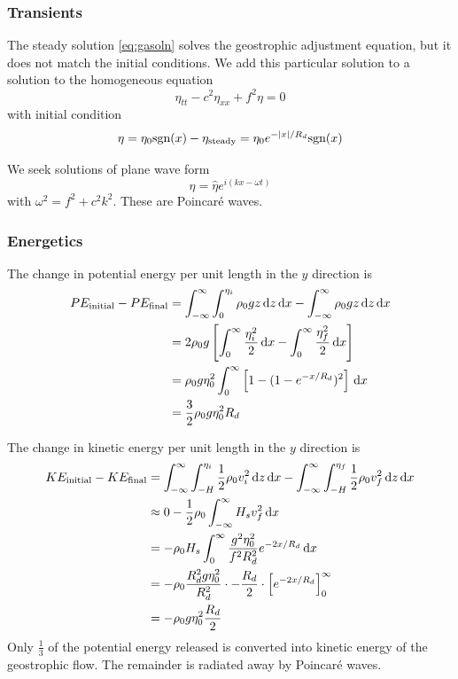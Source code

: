 \documentclass{jknotes}
\begin{document}
\subsubsection{Transients}

The steady solution \eqref{eq:gasoln} solves the geostrophic adjustment
equation, but it does not match the initial conditions. We add this particular
solution to a solution to the homogeneous equation
\begin{equation}
	\eta_{tt} - c^2 \eta_{xx} + f^2 \eta = 0
\end{equation}
with initial condition
\begin{equation}
	\eta = \eta_0 \text{sgn}(x) - \eta_{\text{steady}} = \eta_0
	e^{-\abs{x}/R_d}\text{sgn}(x)
\end{equation}

We seek solutions of plane wave form
\begin{equation}
	\eta = \hat{\eta} e^{i(kx-\omega t)}
\end{equation}
with $\omega^2 = f^2 + c^2 k^2$. These are Poincar\'{e} waves.

\subsubsection{Energetics}
The change in potential energy per unit length in the $y$ direction is
\begin{align}
	PE_{\text{initial}} - PE_{\text{final}} &= \int_{-\infty}^\infty
	\int_0^{\eta_i} \rho_0 g z \, \diffd z \, \diffd x - \int_{-\infty}^\infty
	\rho_0 g z \, \diffd z\,\diffd x \\
	&= 2\rho_0 g \left[ \int_0^\infty \frac{\eta_i^2}{2}\,\diffd x -
\int_0^\infty \frac{\eta_f^2}{2}\,\diffd x \right] \\
&= \rho_0 g \eta_0^2 \int_0^\infty \left[ 1- (1-e^{-x/R_d})^2\right] \, \diffd
x\\
&= \frac{3}{2}\rho_0 g \eta_0^2 R_d
\end{align}

The change in kinetic energy per unit length in the $y$ direction is
\begin{align}
	KE_{\text{initial}} - KE_{\text{final}} &= \int_{-\infty}^\infty
	\int_{-H}^{\eta_i} \frac{1}{2} \rho_0 v_i^2 \,\diffd z\, \diffd x -
	\int_{-\infty}^\infty \int_{-H}^{\eta_f} \frac{1}{2} \rho_0 v_f^2 \,\diffd
	z\, \diffd x \\
	&\approx 0 - \frac{1}{2}\rho_0 \int_{-\infty}^\infty H_s v^2_f \, \diffd x
	\\
	&= -\rho_0 H_s \int_0^\infty \frac{g^2 \eta_0^2}{f^2 R_d^2} e^{-2x/R_d} \,
	\diffd x \\
	&= -\rho_0 \frac{R_d^2 g \eta_0^2}{R_d^2}\cdot -\frac{R_d}{2} \cdot \left[
e^{-2x/R_d} \right]_0^\infty \\
&= -\rho_0 g \eta_0^2 \frac{R_d}{2}
\end{align}
Only $\frac{1}{3}$ of the potential energy released is converted into kinetic
energy of the geostrophic flow. The remainder is radiated away by Poincar\'{e}
waves.
\end{document}
